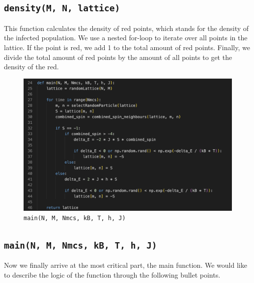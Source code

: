\documentclass[11pt]{book}
\begin{document}
\subsection{\texttt{density(M, N, lattice)}}

This function calculates the density of red points, which stands for the density of the infected population. We use a nested for-loop to iterate over all points in the lattice. If the point is red, we add 1 to the total amount of red points. Finally, we divide the total amount of red points by the amount of all points to get the density of the red.

\begin{figure}
    \centering
    \includegraphics[width=1\linewidth]{nn_main.png}
    \caption{\texttt{main(N, M, Nmcs, kB, T, h, J)}}
    \label{fig44}
\end{figure}

\subsection{\texttt{main(N, M, Nmcs, kB, T, h, J)}}

Now we finally arrive at the most critical part, the main function. We would like to describe the logic of the function through the following bullet points.
\end{document}

